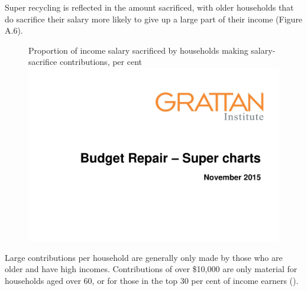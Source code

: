 \documentclass{grattanAlpha}
\begin{document}
Super recycling is reflected in the amount sacrificed, with older households that do sacrifice their salary more likely to give up a large part of their income (Figure A.6). 

\begin{figure}
%
{Proportion of income salary sacrificed by households making salary-sacrifice contributions, per cent}
\includegraphics[width=\columnwidth,page=40]{super-atlas/PPTX.pdf}

\end{figure}

Large contributions per household are generally only made by those who are older and have high incomes. Contributions of over 
\$10,000 are only material for households aged over 60, or for those in the top 30 per cent of income earners (). 
\end{document}
